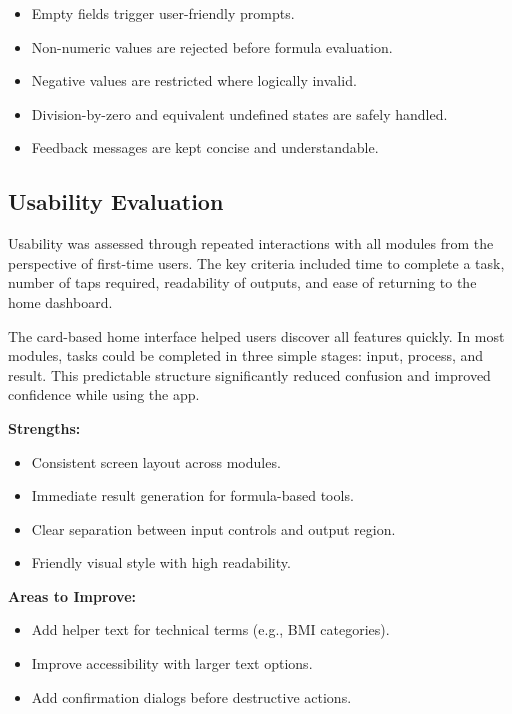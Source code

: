 \documentclass{article}
\begin{document}
\begin{insightbox}
\begin{itemize}
\item Empty fields trigger user-friendly prompts.
\item Non-numeric values are rejected before formula evaluation.
\item Negative values are restricted where logically invalid.
\item Division-by-zero and equivalent undefined states are safely handled.
\item Feedback messages are kept concise and understandable.
\end{itemize}
\end{insightbox}

\subsection{Usability Evaluation}
Usability was assessed through repeated interactions with all modules from the perspective of first-time users. The key criteria included time to complete a task, number of taps required, readability of outputs, and ease of returning to the home dashboard.

The card-based home interface helped users discover all features quickly. In most modules, tasks could be completed in three simple stages: input, process, and result. This predictable structure significantly reduced confusion and improved confidence while using the app.

\begin{featurebox}
\textbf{Strengths:}
\begin{itemize}
\item Consistent screen layout across modules.
\item Immediate result generation for formula-based tools.
\item Clear separation between input controls and output region.
\item Friendly visual style with high readability.
\end{itemize}
\textbf{Areas to Improve:}
\begin{itemize}
\item Add helper text for technical terms (e.g., BMI categories).
\item Improve accessibility with larger text options.
\item Add confirmation dialogs before destructive actions.
\end{itemize}
\end{featurebox}
\end{document}
